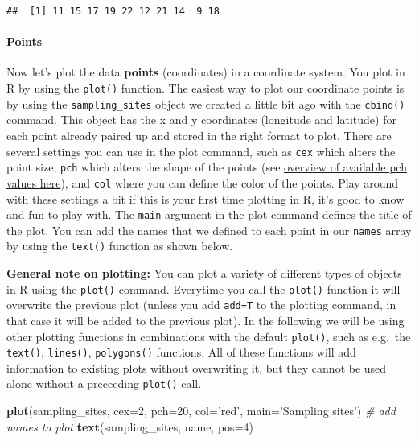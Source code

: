 \documentclass[]{article}
\newenvironment{Shaded}{\begin{snugshade}}{\end{snugshade}}
\newcommand{\CommentTok}[1]{\textcolor[rgb]{0.56,0.35,0.01}{\textit{#1}}}
\newcommand{\DataTypeTok}[1]{\textcolor[rgb]{0.13,0.29,0.53}{#1}}
\newcommand{\DecValTok}[1]{\textcolor[rgb]{0.00,0.00,0.81}{#1}}
\newcommand{\KeywordTok}[1]{\textcolor[rgb]{0.13,0.29,0.53}{\textbf{#1}}}
\newcommand{\NormalTok}[1]{#1}
\newcommand{\StringTok}[1]{\textcolor[rgb]{0.31,0.60,0.02}{#1}}
\let\oldparagraph\paragraph
\renewcommand{\paragraph}[1]{\oldparagraph{#1}\mbox{}}
\begin{document}
\begin{verbatim}
##  [1] 11 15 17 19 22 12 21 14  9 18
\end{verbatim}

\hypertarget{points}{%
\paragraph{Points}\label{points}}

Now let's plot the data \textbf{points} (coordinates) in a coordinate
system. You plot in R by using the \texttt{plot()} function. The easiest
way to plot our coordinate points is by using the
\texttt{sampling\_sites} object we created a little bit ago with the
\texttt{cbind()} command. This object has the x and y coordinates
(longitude and latitude) for each point already paired up and stored in
the right format to plot. There are several settings you can use in the
plot command, such as \texttt{cex} which alters the point size,
\texttt{pch} which alters the shape of the points (see
\href{http://coleoguy.blogspot.com/2016/06/symbols-and-colors-in-r-pch-argument.html}{overview
of available pch values here}), and \texttt{col} where you can define
the color of the points. Play around with these settings a bit if this
is your first time plotting in R, it's good to know and fun to play
with. The \texttt{main} argument in the plot command defines the title
of the plot. You can add the names that we defined to each point in our
\texttt{names} array by using the \texttt{text()} function as shown
below.

\textbf{General note on plotting:} You can plot a variety of different
types of objects in R using the \texttt{plot()} command. Everytime you
call the \texttt{plot()} function it will overwrite the previous plot
(unless you add \texttt{add=T} to the plotting command, in that case it
will be added to the previous plot). In the following we will be using
other plotting functions in combinations with the default
\texttt{plot()}, such as e.g.~the \texttt{text()}, \texttt{lines()},
\texttt{polygons()} functions. All of these functions will add
information to existing plots without overwriting it, but they cannot be
used alone without a preceeding \texttt{plot()} call.

\begin{Shaded}
\begin{Highlighting}[]
\KeywordTok{plot}\NormalTok{(sampling_sites, }\DataTypeTok{cex=}\DecValTok{2}\NormalTok{, }\DataTypeTok{pch=}\DecValTok{20}\NormalTok{, }\DataTypeTok{col=}\StringTok{'red'}\NormalTok{, }\DataTypeTok{main=}\StringTok{'Sampling sites'}\NormalTok{)}
\CommentTok{# add names to plot}
\KeywordTok{text}\NormalTok{(sampling_sites, name, }\DataTypeTok{pos=}\DecValTok{4}\NormalTok{)}
\end{Highlighting}
\end{Shaded}
\end{document}
